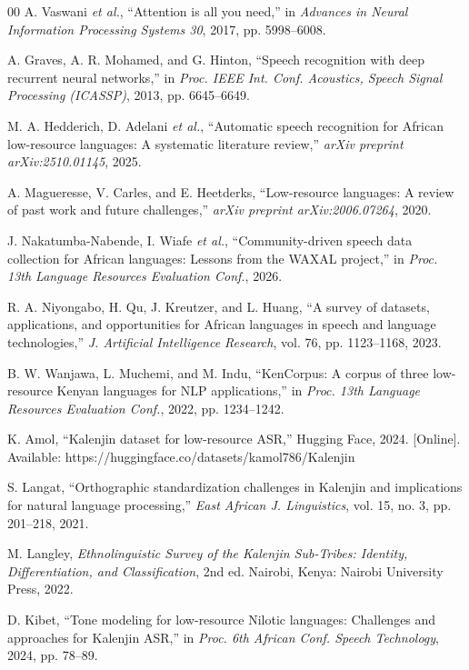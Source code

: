 \documentclass[conference]{IEEEtran}
\begin{document}
\begin{thebibliography}{00}
 A. Vaswani \textit{et al.}, ``Attention is all you need,'' in \textit{Advances in Neural Information Processing Systems 30}, 2017, pp. 5998--6008.

 A. Graves, A. R. Mohamed, and G. Hinton, ``Speech recognition with deep recurrent neural networks,'' in \textit{Proc. IEEE Int. Conf. Acoustics, Speech Signal Processing (ICASSP)}, 2013, pp. 6645--6649.

 M. A. Hedderich, D. Adelani \textit{et al.}, ``Automatic speech recognition for African low-resource languages: A systematic literature review,'' \textit{arXiv preprint arXiv:2510.01145}, 2025.

 A. Magueresse, V. Carles, and E. Heetderks, ``Low-resource languages: A review of past work and future challenges,'' \textit{arXiv preprint arXiv:2006.07264}, 2020.

 J. Nakatumba-Nabende, I. Wiafe \textit{et al.}, ``Community-driven speech data collection for African languages: Lessons from the WAXAL project,'' in \textit{Proc. 13th Language Resources Evaluation Conf.}, 2026.

 R. A. Niyongabo, H. Qu, J. Kreutzer, and L. Huang, ``A survey of datasets, applications, and opportunities for African languages in speech and language technologies,'' \textit{J. Artificial Intelligence Research}, vol. 76, pp. 1123--1168, 2023.

 B. W. Wanjawa, L. Muchemi, and M. Indu, ``KenCorpus: A corpus of three low-resource Kenyan languages for NLP applications,'' in \textit{Proc. 13th Language Resources Evaluation Conf.}, 2022, pp. 1234--1242.

 K. Amol, ``Kalenjin dataset for low-resource ASR,'' Hugging Face, 2024. [Online]. Available: https://huggingface.co/datasets/kamol786/Kalenjin

 S. Langat, ``Orthographic standardization challenges in Kalenjin and implications for natural language processing,'' \textit{East African J. Linguistics}, vol. 15, no. 3, pp. 201--218, 2021.

 M. Langley, \textit{Ethnolinguistic Survey of the Kalenjin Sub-Tribes: Identity, Differentiation, and Classification}, 2nd ed. Nairobi, Kenya: Nairobi University Press, 2022.

 D. Kibet, ``Tone modeling for low-resource Nilotic languages: Challenges and approaches for Kalenjin ASR,'' in \textit{Proc. 6th African Conf. Speech Technology}, 2024, pp. 78--89.


\end{thebibliography}
\end{document}
